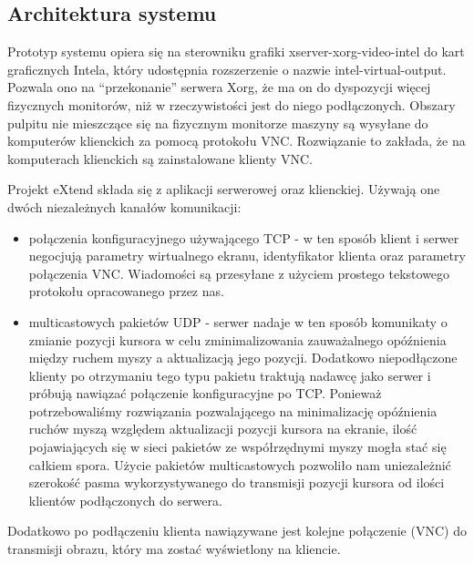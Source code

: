     \vfill

  \subsection{Architektura systemu}

    Prototyp systemu opiera się na sterowniku grafiki xserver-xorg-video-intel do kart graficznych Intela, który udostępnia rozszerzenie o nazwie intel-virtual-output. Pozwala ono na ``przekonanie'' serwera Xorg, że ma on do dyspozycji więcej fizycznych monitorów, niż w rzeczywistości jest do niego podłączonych. Obszary pulpitu nie mieszczące się na fizycznym monitorze maszyny są wysyłane do komputerów klienckich za pomocą protokołu VNC. Rozwiązanie to zakłada, że na komputerach klienckich są zainstalowane klienty VNC.


    Projekt eXtend składa się z aplikacji serwerowej oraz klienckiej. Używają one dwóch niezależnych kanałów komunikacji:
    \begin{itemize}
      \item połączenia konfiguracyjnego używającego TCP - w ten sposób klient i serwer negocjują parametry wirtualnego ekranu, identyfikator klienta oraz parametry połączenia VNC. Wiadomości są przesyłane z użyciem prostego tekstowego protokołu opracowanego przez nas.
      \item multicastowych pakietów UDP - serwer nadaje w ten sposób komunikaty o zmianie pozycji kursora w celu zminimalizowania zauważalnego opóźnienia między ruchem myszy a aktualizacją jego pozycji. Dodatkowo niepodłączone klienty po otrzymaniu tego typu pakietu traktują nadawcę jako serwer i próbują nawiązać połączenie konfiguracyjne po TCP. Ponieważ potrzebowaliśmy rozwiązania pozwalającego na minimalizację opóźnienia ruchów myszą względem aktualizacji pozycji kursora na ekranie, ilość pojawiających się w sieci pakietów ze współrzędnymi myszy mogła stać się całkiem spora. Użycie pakietów multicastowych pozwoliło nam uniezależnić szerokość pasma wykorzystywanego do transmisji pozycji kursora od ilości klientów podłączonych do serwera.
    \end{itemize}

    Dodatkowo po podłączeniu klienta nawiązywane jest kolejne połączenie (VNC) do transmisji obrazu, który ma zostać wyświetlony na kliencie.


